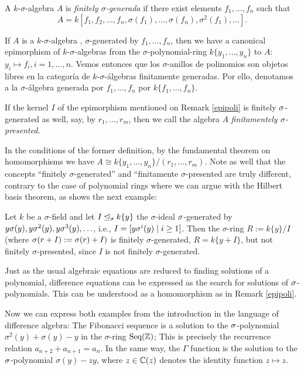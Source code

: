 \begin{defn}
A $k$-$\sigma$-algebra  $A$ is \emph{finitely $\sigma$-generada} if there exist elements $f_1, \ldots, f_n$ such that $$A = k[f_1,f_2,\ldots,f_n,\sigma(f_1),\ldots,\sigma(f_n),\sigma^2(f_1),\ldots].$$
\end{defn}

\begin{rem}\label{epipoli}
If $A$ is a $k$-$\sigma$-algebra , $\sigma$-generated by $f_1, \ldots, f_n$, then we have a canonical epimorphism of $k$-$\sigma$-algebras from the $\sigma$-polynomial-ring $k\{y_1, \ldots, y_n \}$ to $A$: $y_i \mapsto f_i, i = 1, \ldots, n$. Vemos entonces que los $\sigma$-anillos de polinomios son objetos libres en la categor\'ia de $k$-$\sigma$-\'algebras finitamente generadas. Por ello, denotamos a la $\sigma$-\'algebra  generada por $f_1, \ldots, f_n$ por $k\{f_1, \ldots, f_n\}$.
\end{rem}

\begin{defn}
If the kernel $I$ of the epimorphism mentioned on Remark \ref{epipoli} is finitely $\sigma$-generated as well, say, by $r_1, \ldots, r_m$, then we call the algebra $A$ \emph{finitamentely $\sigma$-presented}. 
\end{defn}

\begin{rem}
In the conditions of the former definition, by the fundamental theorem on homomorphisms we have $A \cong k\{y_1, \ldots, y_n\}/(r_1,\ldots,r_m)$. Note as well that the concepts ``finitely $\sigma$-generated'' and ``finitamente $\sigma$-presented are truly different, contrary to the case of polynomial rings where we can argue with the Hilbert basis theorem, as shows the next example:
\end{rem}

\begin{ex}
Let $k$ be a $\sigma$-field and let $I \unlhd_{\sigma} k\{y\} $ the $\sigma$-ideal $\sigma$-generated by $y\sigma(y), y\sigma^2(y), y\sigma^3(y), \ldots$, i.e., $I = [y \sigma^i(y) \mid i\geq 1]$. Then the $\sigma$-ring $R := k\{y\}/I$ (where $\sigma (r + I) := \sigma(r) + I)$ is 
finitely $\sigma$-generated, $R = k\{ y + I \}$, but not finitely $\sigma$-presented, since $I$ is not finitely $\sigma$-generated.
\end{ex}


Just as the usual algebraic equations are reduced to finding solutions of a polynomial, difference equations can be expressed as the search for solutions of $\sigma$-polynomials. This can be understood as a homomorphism as in Remark \ref{epipoli}.

\begin{ex}
Now we can express both examples from the introduction in the language of difference algebra:
The Fibonacci sequence is a solution to the $\sigma$-polynomial $\sigma^2(y) + \sigma(y) - y$ in the $\sigma$-ring  $\text{Seq}(\mathbb{Z})$; This is precisely the recurrence relation $a_{n+2} + a_{n+1} = a_n$.
In the same way, the $\Gamma$ function is the solution to the $\sigma$-polynomial $\sigma(y) - zy$, where $z \in \mathbb{C}(z)$ denotes the identity function $z \mapsto z$.
\end{ex}
